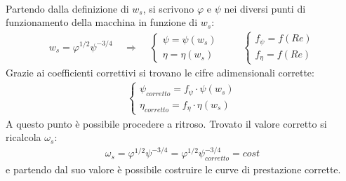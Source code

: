 \\Partendo dalla definizione di $w_s$, si scrivono $\varphi$ e $\psi$ nei diversi punti di funzionamento della macchina in funzione di $w_s$:
\begin{align*}
w_s= \varphi^{1/2}\psi^{-3/4} \;\;\;\; \Rightarrow \;\;\;\;
\begin{cases}
\psi = \psi(w_s)\\
\eta = \eta(w_s)
\end{cases} \;\;\;\;\;\;\;\;
\begin{cases}
f_{\psi} = f(Re)\\
f_{\eta} = f(Re)
\end{cases}
\end{align*}
Grazie ai coefficienti correttivi si trovano le cifre adimensionali corrette:
\begin{align*}
\begin{cases}
\psi_{corretto} = f_{\psi} \cdot \psi(w_s)\\
\eta_{corretto} = f_{\eta} \cdot \eta(w_s)
\end{cases}
\end{align*}
A questo punto è possibile procedere a ritroso. Trovato il valore corretto si ricalcola $\omega_s$:
\begin{align*}
\omega_s = \varphi^{1/2} \psi^{-3/4} =  \varphi^{1/2} \psi_{corretto}^{-3/4} = cost
\end{align*}
e partendo dal suo valore è possibile costruire le curve di prestazione corrette.
